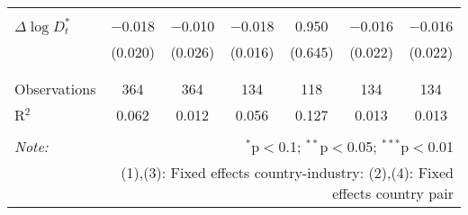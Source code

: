 \begin{tabular}{@{\extracolsep{5pt}}lcccccc}
  & & & & & & \\ 
 $\Delta \log D_t^*$ & $-$0.018 & $-$0.010 & $-$0.018 & 0.950 & $-$0.016 & $-$0.016 \\ 
  & (0.020) & (0.026) & (0.016) & (0.645) & (0.022) & (0.022) \\ 
  & & & & & & \\ 
\hline \\[-1.8ex] 
Observations & 364 & 364 & 134 & 118 & 134 & 134 \\ 
R$^{2}$ & 0.062 & 0.012 & 0.056 & 0.127 & 0.013 & 0.013 \\ 
\hline 
\hline \\[-1.8ex] 
\textit{Note:}  & \multicolumn{6}{r}{$^{*}$p$<$0.1; $^{**}$p$<$0.05; $^{***}$p$<$0.01} \\ 
 & \multicolumn{6}{r}{(1),(3): Fixed effects country-industry: (2),(4): Fixed effects country pair} \\ 
\end{tabular} 

